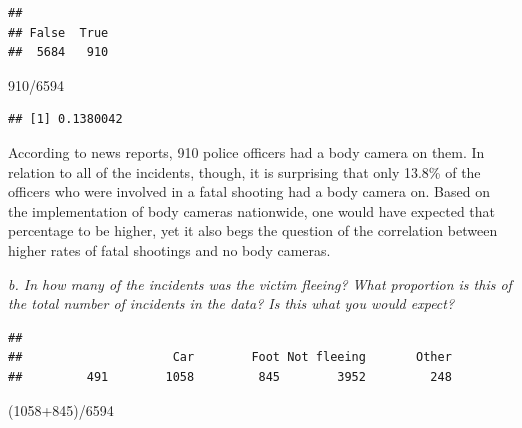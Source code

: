 \documentclass[
]{article}
\newenvironment{Shaded}{\begin{snugshade}}{\end{snugshade}}
\newcommand{\DecValTok}[1]{\textcolor[rgb]{0.00,0.00,0.81}{#1}}
\newcommand{\FunctionTok}[1]{\textcolor[rgb]{0.00,0.00,0.00}{#1}}
\newcommand{\NormalTok}[1]{#1}
\newcommand{\SpecialCharTok}[1]{\textcolor[rgb]{0.00,0.00,0.00}{#1}}
\begin{document}
\begin{Shaded}
\end{Shaded}

\begin{verbatim}
## 
## False  True 
##  5684   910
\end{verbatim}

\begin{Shaded}
\begin{Highlighting}[]
\DecValTok{910}\SpecialCharTok{/}\DecValTok{6594}
\end{Highlighting}
\end{Shaded}

\begin{verbatim}
## [1] 0.1380042
\end{verbatim}

According to news reports, 910 police officers had a body camera on
them. In relation to all of the incidents, though, it is surprising that
only 13.8\% of the officers who were involved in a fatal shooting had a
body camera on. Based on the implementation of body cameras nationwide,
one would have expected that percentage to be higher, yet it also begs
the question of the correlation between higher rates of fatal shootings
and no body cameras.

\emph{b. In how many of the incidents was the victim fleeing? What
proportion is this of the total number of incidents in the data? Is this
what you would expect?}

\begin{Shaded}
\end{Shaded}

\begin{verbatim}
## 
##                     Car        Foot Not fleeing       Other 
##         491        1058         845        3952         248
\end{verbatim}

\begin{Shaded}
\begin{Highlighting}[]
\NormalTok{(}\DecValTok{1058}\SpecialCharTok{+}\DecValTok{845}\NormalTok{)}\SpecialCharTok{/}\DecValTok{6594}
\end{Highlighting}
\end{Shaded}
\end{document}
